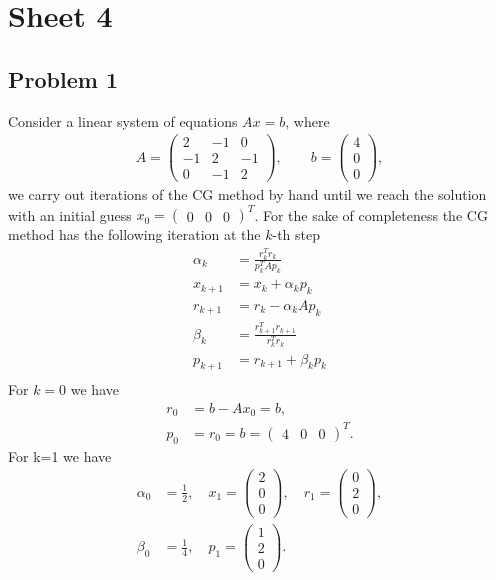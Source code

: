 


\maketitle
\tableofcontents
\section{Sheet 4}
\subsection{Problem 1}
Consider a linear system of equations $Ax = b$, where
\begin{align}
    A =
    \begin{pmatrix}
        2 & -1 & 0 \\
        -1 & 2 & -1\\
        0 & -1 & 2
    \end{pmatrix}, \qquad
    b =
    \begin{pmatrix}
        4 \\ 0 \\ 0
    \end{pmatrix},
\end{align}
we carry out iterations of the CG method by hand until we reach the
solution with an initial guess $x_0 = \begin{pmatrix} 0 & 0 & 0
\end{pmatrix}^T$. For the sake of completeness the CG method has the following
iteration at the $k$-th step
\begin{align}
    \alpha_k &= \frac{r_k^Tr_k}{p_k^TAp_k}\\
    x_{k+1} &=  x_k + \alpha_k p_k\\
    r_{k+1} &= r_k - \alpha_k A p_k \\
    \beta_{k} &= \frac{r_{k+1}^Tr_{k+1}}{r_{k}^T r_k}\\
    p_{k+1} &= r_{k+1} + \beta_{k}p_k \\
\end{align}
For $k=0$ we have
\begin{align}
    r_0 &= b - Ax_0 = b,\\
    p_0 &= r_0 = b = \begin{pmatrix} 4 & 0 & 0 \end{pmatrix}^T.
\end{align}
For k=1 we have
\begin{align}
    \alpha_0 &= \frac{1}{2}, \quad x_1=\begin{pmatrix} 2 \\ 0 \\0
        \end{pmatrix}, \quad r_1 = \begin{pmatrix} 0 \\ 2 \\0
    \end{pmatrix},\\
    \beta_0 &= \frac{1}{4},\quad p_1 = \begin{pmatrix} 1\\2\\0
    \end{pmatrix}.
\end{align}
